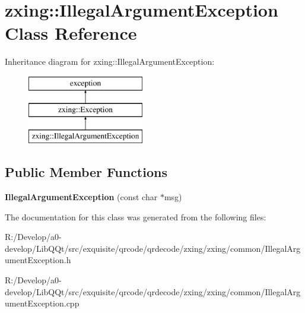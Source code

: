 \hypertarget{classzxing_1_1_illegal_argument_exception}{}\section{zxing\+:\+:Illegal\+Argument\+Exception Class Reference}
\label{classzxing_1_1_illegal_argument_exception}
Inheritance diagram for zxing\+:\+:Illegal\+Argument\+Exception\+:\begin{figure}[H]
\begin{center}
\leavevmode
\includegraphics[height=3.000000cm]{classzxing_1_1_illegal_argument_exception}
\end{center}
\end{figure}
\subsection*{Public Member Functions}
\begin{DoxyCompactItemize}
\item 
\mbox{\label{classzxing_1_1_illegal_argument_exception_a937136f5c4b60eec67115ec7d4737fce}} 
{\bfseries Illegal\+Argument\+Exception} (const char $\ast$msg)
\end{DoxyCompactItemize}


The documentation for this class was generated from the following files\+:\begin{DoxyCompactItemize}
\item 
R\+:/\+Develop/a0-\/develop/\+Lib\+Q\+Qt/src/exquisite/qrcode/qrdecode/zxing/zxing/common/Illegal\+Argument\+Exception.\+h\item 
R\+:/\+Develop/a0-\/develop/\+Lib\+Q\+Qt/src/exquisite/qrcode/qrdecode/zxing/zxing/common/Illegal\+Argument\+Exception.\+cpp\end{DoxyCompactItemize}
